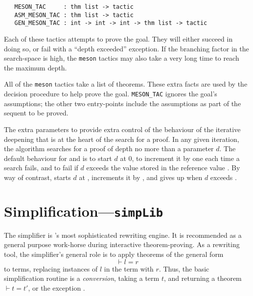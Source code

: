 \begin{verbatim}
   MESON_TAC     : thm list -> tactic
   ASM_MESON_TAC : thm list -> tactic
   GEN_MESON_TAC : int -> int -> int -> thm list -> tactic
\end{verbatim}

Each of these tactics attempts to prove the goal.  They will either
succeed in doing so, or fail with a ``depth exceeded'' exception.  If
the branching factor in the search-space is high, the \texttt{meson}
tactics may also take a very long time to reach the maximum depth.

All of the \texttt{meson} tactics take a list of theorems.  These
extra facts are used by the decision procedure to help prove the goal.
\texttt{MESON\_TAC} ignores the goal's assumptions; the other two
entry-points include the assumptions as part of the sequent to be
proved.

The extra parameters to  provide extra control of
the behaviour of the iterative deepening that is at the heart of the
search for a proof.  In any given iteration, the algorithm searches
for a proof of depth no more than a parameter $d$.  The default
behaviour for  and  is to start $d$
at 0, to increment it by one each time a search fails, and to fail if
$d$ exceeds the value stored in the reference value
.  By way of contrast,
 starts $d$ at , increments
it by , and gives up when $d$ exceeds .



\section{Simplification---\texttt{simpLib}}
\label{sec:simpLib}

The simplifier is \HOL's most sophisticated rewriting engine.  It is
recommended as a general purpose work-horse during interactive
theorem-proving.  As a rewriting tool, the simplifier's general role
is to apply theorems of the general form
\[
\vdash l = r
\]
to terms, replacing instances of $l$ in the term with $r$. Thus, the
basic simplification routine is a \emph{conversion}, taking a term
$t$, and returning a theorem $\vdash t = t'$, or the exception
.

